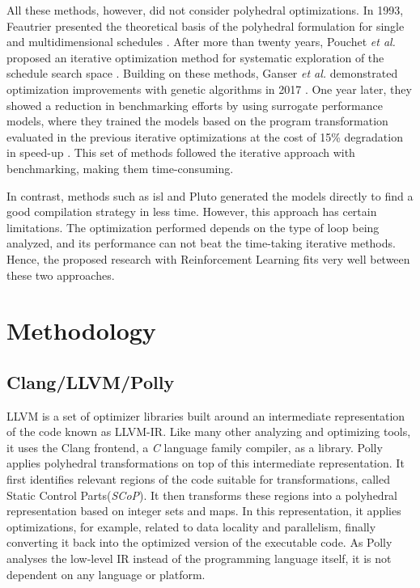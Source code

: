 \documentclass[logo,msc]{infthesis}           %
\begin{document}
All these methods, however, did not consider polyhedral optimizations. In 1993, Feautrier presented the theoretical basis of the polyhedral formulation for single and multidimensional schedules \cite{single}\cite{multi}. After more than twenty years, Pouchet \textit{et al.} proposed an iterative optimization method for systematic exploration of the schedule search space \cite{it_Single}\cite{it_multi}. Building on these methods, Ganser \textit{et al.} demonstrated optimization improvements with genetic algorithms in 2017 \cite{10.1145/3109482}. One year later, they showed a reduction in benchmarking efforts by using surrogate performance models, where they trained the models based on the program transformation evaluated in the previous iterative optimizations at the cost of 15\% degradation in speed-up \cite{10.1145/3291773}. This set of methods followed the iterative approach with benchmarking, making them time-consuming.

In contrast, methods such as isl\cite{isl} and Pluto\cite{Bondhugula07pluto:a} generated the models directly to find a good compilation strategy in less time. However, this approach has certain limitations. The optimization performed depends on the type of loop being analyzed, and its performance can not beat the time-taking iterative methods. Hence, the proposed research with Reinforcement Learning fits very well between these two approaches.

\chapter{Methodology}

\section{Clang/LLVM/Polly}

LLVM is a set of optimizer libraries built around an intermediate representation of the code known as LLVM-IR. Like many other analyzing and optimizing tools, it uses the Clang frontend, a \textit{C} language family compiler, as a library.
Polly applies polyhedral transformations on top of this intermediate representation\cite{grosser2011polly}. It first identifies relevant regions of the code suitable for transformations, called Static Control Parts(\textit{SCoP})\cite{grosser2011polly}. It then transforms these regions into a polyhedral representation based on integer sets and maps. In this representation, it applies optimizations, for example, related to data locality and parallelism, finally converting it back into the optimized version of the executable code. As Polly analyses the low-level IR instead of the programming language itself, it is not dependent on any language or platform.
\end{document}
